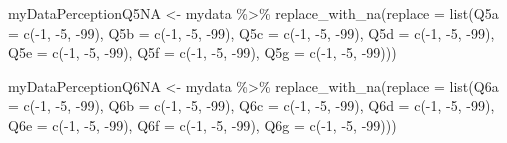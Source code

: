 \documentclass[
]{article}
\newenvironment{Shaded}{\begin{snugshade}}{\end{snugshade}}
\newcommand{\AttributeTok}[1]{\textcolor[rgb]{0.77,0.63,0.00}{#1}}
\newcommand{\DecValTok}[1]{\textcolor[rgb]{0.00,0.00,0.81}{#1}}
\newcommand{\FunctionTok}[1]{\textcolor[rgb]{0.00,0.00,0.00}{#1}}
\newcommand{\NormalTok}[1]{#1}
\newcommand{\OtherTok}[1]{\textcolor[rgb]{0.56,0.35,0.01}{#1}}
\newcommand{\SpecialCharTok}[1]{\textcolor[rgb]{0.00,0.00,0.00}{#1}}
\begin{document}
\begin{Shaded}
\begin{Highlighting}[]
\NormalTok{myDataPerceptionQ5NA }\OtherTok{\textless{}{-}}\NormalTok{ mydata }\SpecialCharTok{\%\textgreater{}\%} \FunctionTok{replace\_with\_na}\NormalTok{(}\AttributeTok{replace =} \FunctionTok{list}\NormalTok{(}\AttributeTok{Q5a =} \FunctionTok{c}\NormalTok{(}\SpecialCharTok{{-}}\DecValTok{1}\NormalTok{, }\SpecialCharTok{{-}}\DecValTok{5}\NormalTok{, }\SpecialCharTok{{-}}\DecValTok{99}\NormalTok{), }\AttributeTok{Q5b =} \FunctionTok{c}\NormalTok{(}\SpecialCharTok{{-}}\DecValTok{1}\NormalTok{, }\SpecialCharTok{{-}}\DecValTok{5}\NormalTok{, }\SpecialCharTok{{-}}\DecValTok{99}\NormalTok{), }\AttributeTok{Q5c =} \FunctionTok{c}\NormalTok{(}\SpecialCharTok{{-}}\DecValTok{1}\NormalTok{, }\SpecialCharTok{{-}}\DecValTok{5}\NormalTok{, }\SpecialCharTok{{-}}\DecValTok{99}\NormalTok{), }\AttributeTok{Q5d =} \FunctionTok{c}\NormalTok{(}\SpecialCharTok{{-}}\DecValTok{1}\NormalTok{, }\SpecialCharTok{{-}}\DecValTok{5}\NormalTok{, }\SpecialCharTok{{-}}\DecValTok{99}\NormalTok{), }\AttributeTok{Q5e =} \FunctionTok{c}\NormalTok{(}\SpecialCharTok{{-}}\DecValTok{1}\NormalTok{, }\SpecialCharTok{{-}}\DecValTok{5}\NormalTok{, }\SpecialCharTok{{-}}\DecValTok{99}\NormalTok{), }\AttributeTok{Q5f =} \FunctionTok{c}\NormalTok{(}\SpecialCharTok{{-}}\DecValTok{1}\NormalTok{, }\SpecialCharTok{{-}}\DecValTok{5}\NormalTok{, }\SpecialCharTok{{-}}\DecValTok{99}\NormalTok{), }\AttributeTok{Q5g =} \FunctionTok{c}\NormalTok{(}\SpecialCharTok{{-}}\DecValTok{1}\NormalTok{, }\SpecialCharTok{{-}}\DecValTok{5}\NormalTok{, }\SpecialCharTok{{-}}\DecValTok{99}\NormalTok{)))}

\NormalTok{myDataPerceptionQ6NA }\OtherTok{\textless{}{-}}\NormalTok{ mydata }\SpecialCharTok{\%\textgreater{}\%} \FunctionTok{replace\_with\_na}\NormalTok{(}\AttributeTok{replace =} \FunctionTok{list}\NormalTok{(}\AttributeTok{Q6a =} \FunctionTok{c}\NormalTok{(}\SpecialCharTok{{-}}\DecValTok{1}\NormalTok{, }\SpecialCharTok{{-}}\DecValTok{5}\NormalTok{, }\SpecialCharTok{{-}}\DecValTok{99}\NormalTok{), }\AttributeTok{Q6b =} \FunctionTok{c}\NormalTok{(}\SpecialCharTok{{-}}\DecValTok{1}\NormalTok{, }\SpecialCharTok{{-}}\DecValTok{5}\NormalTok{, }\SpecialCharTok{{-}}\DecValTok{99}\NormalTok{), }\AttributeTok{Q6c =} \FunctionTok{c}\NormalTok{(}\SpecialCharTok{{-}}\DecValTok{1}\NormalTok{, }\SpecialCharTok{{-}}\DecValTok{5}\NormalTok{, }\SpecialCharTok{{-}}\DecValTok{99}\NormalTok{), }\AttributeTok{Q6d =} \FunctionTok{c}\NormalTok{(}\SpecialCharTok{{-}}\DecValTok{1}\NormalTok{, }\SpecialCharTok{{-}}\DecValTok{5}\NormalTok{, }\SpecialCharTok{{-}}\DecValTok{99}\NormalTok{), }\AttributeTok{Q6e =} \FunctionTok{c}\NormalTok{(}\SpecialCharTok{{-}}\DecValTok{1}\NormalTok{, }\SpecialCharTok{{-}}\DecValTok{5}\NormalTok{, }\SpecialCharTok{{-}}\DecValTok{99}\NormalTok{), }\AttributeTok{Q6f =} \FunctionTok{c}\NormalTok{(}\SpecialCharTok{{-}}\DecValTok{1}\NormalTok{, }\SpecialCharTok{{-}}\DecValTok{5}\NormalTok{, }\SpecialCharTok{{-}}\DecValTok{99}\NormalTok{), }\AttributeTok{Q6g =} \FunctionTok{c}\NormalTok{(}\SpecialCharTok{{-}}\DecValTok{1}\NormalTok{, }\SpecialCharTok{{-}}\DecValTok{5}\NormalTok{, }\SpecialCharTok{{-}}\DecValTok{99}\NormalTok{)))}


\end{Highlighting}
\end{Shaded}
\end{document}
